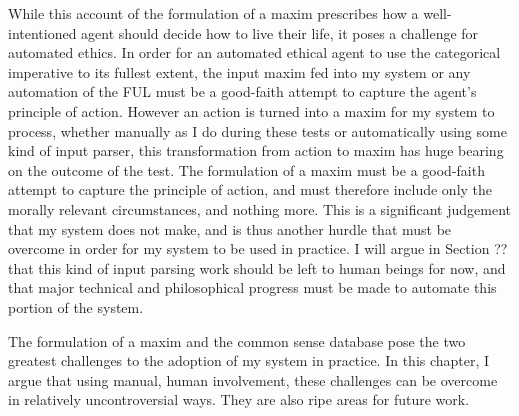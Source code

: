 \begin{isabellebody}
\begin{isamarkuptext}
While this account of the formulation of a maxim prescribes how a well-intentioned agent should
decide how to live their life, it poses a challenge for automated ethics. In order for an automated
ethical agent to use the categorical imperative to its fullest extent, the input maxim fed into
my system or any automation of the FUL must be a good-faith attempt to capture the agent's principle
of action. However an action is turned into a maxim for my system to process, whether manually as I do
during these tests or automatically using some kind of input parser, this transformation from action
to maxim has huge bearing on the outcome of the test. The formulation of a maxim must be a good-faith 
attempt to capture the principle of action, and must therefore include only the morally relevant
circumstances, and nothing more. This is a significant judgement that my system does not make, and is 
thus another hurdle that must be overcome in order for my system to be used in practice. I will argue
in Section ?? that this kind of input parsing work should be left to human beings for now, and that
major technical and philosophical progress must be made to automate this portion of the system. 

The formulation of a maxim and the common sense database pose the two greatest challenges to the adoption
of my system in practice. In this chapter, I argue that using manual, human involvement, these challenges
can be overcome in relatively uncontroversial ways. They are also ripe areas for future work.%
\end{isamarkuptext}\isamarkuptrue%
%
\isadelimdocument
%
\endisadelimdocument
%
\isatagdocument
%
\isamarkuptrue%
%
\endisatagdocument
{\isafolddocument}%
%
\isadelimdocument
%
\endisadelimdocument
%
\isadelimtheory
%
\endisadelimtheory
%
\isatagtheory
%
\endisatagtheory
{\isafoldtheory}%
%
\isadelimtheory
%
\endisadelimtheory
%
\end{isabellebody}%
\endinput
